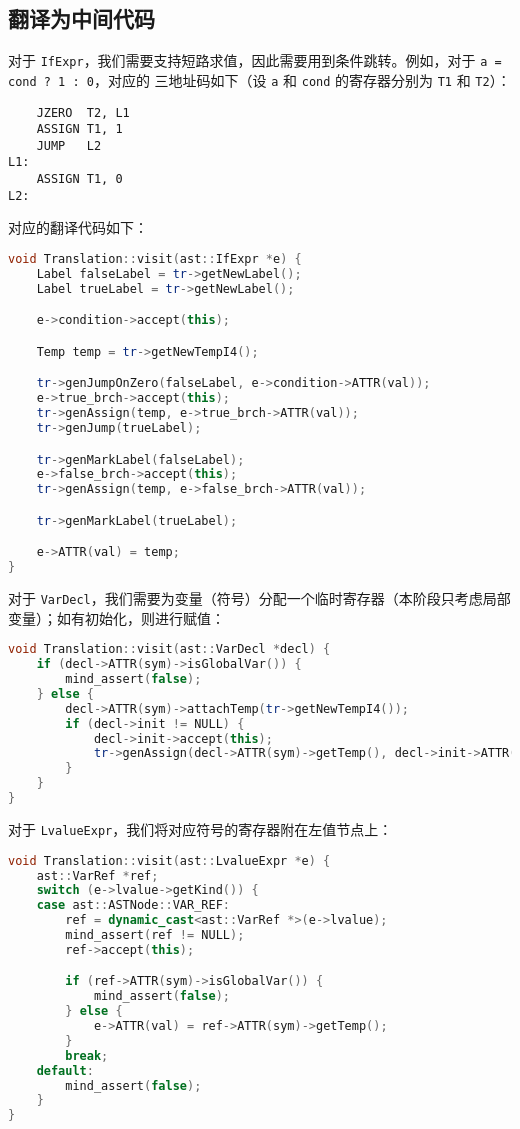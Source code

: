 \documentclass[a4paper]{article}
\begin{document}
\subsection{翻译为中间代码}

对于 \texttt{IfExpr}，我们需要支持短路求值，因此需要用到条件跳转。例如，对于 \texttt{a = cond ? 1 : 0}，对应的
三地址码如下（设 \texttt{a} 和 \texttt{cond} 的寄存器分别为 \texttt{T1} 和 \texttt{T2}）：

\begin{lstlisting}
    JZERO  T2, L1
    ASSIGN T1, 1
    JUMP   L2
L1:
    ASSIGN T1, 0
L2:
\end{lstlisting}

对应的翻译代码如下：

\begin{lstlisting}[language=c++]
void Translation::visit(ast::IfExpr *e) {
    Label falseLabel = tr->getNewLabel();
    Label trueLabel = tr->getNewLabel();

    e->condition->accept(this);

    Temp temp = tr->getNewTempI4();

    tr->genJumpOnZero(falseLabel, e->condition->ATTR(val));
    e->true_brch->accept(this);
    tr->genAssign(temp, e->true_brch->ATTR(val));
    tr->genJump(trueLabel);

    tr->genMarkLabel(falseLabel);
    e->false_brch->accept(this);
    tr->genAssign(temp, e->false_brch->ATTR(val));

    tr->genMarkLabel(trueLabel);

    e->ATTR(val) = temp;
}
\end{lstlisting}

对于 \texttt{VarDecl}，我们需要为变量（符号）分配一个临时寄存器（本阶段只考虑局部变量）；如有初始化，则进行赋值：

\begin{lstlisting}[language=c++]
void Translation::visit(ast::VarDecl *decl) {
    if (decl->ATTR(sym)->isGlobalVar()) {
        mind_assert(false);
    } else {
        decl->ATTR(sym)->attachTemp(tr->getNewTempI4());
        if (decl->init != NULL) {
            decl->init->accept(this);
            tr->genAssign(decl->ATTR(sym)->getTemp(), decl->init->ATTR(val));
        }
    }
}
\end{lstlisting}

对于 \texttt{LvalueExpr}，我们将对应符号的寄存器附在左值节点上：

\begin{lstlisting}[language=c++]
void Translation::visit(ast::LvalueExpr *e) {
    ast::VarRef *ref;
    switch (e->lvalue->getKind()) {
    case ast::ASTNode::VAR_REF:
        ref = dynamic_cast<ast::VarRef *>(e->lvalue);
        mind_assert(ref != NULL);
        ref->accept(this);

        if (ref->ATTR(sym)->isGlobalVar()) {
            mind_assert(false);
        } else {
            e->ATTR(val) = ref->ATTR(sym)->getTemp();
        }
        break;
    default:
        mind_assert(false);
    }
}
\end{lstlisting}
\end{document}
